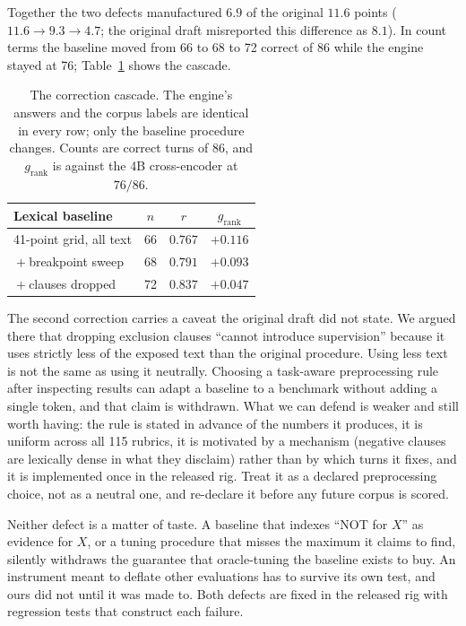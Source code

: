 \documentclass[10pt,twocolumn]{article}
\newcommand{\grank}{$g_{\mathrm{rank}}$}
\begin{document}
Together the two defects manufactured $6.9$ of the original $11.6$ points
($11.6 \rightarrow 9.3 \rightarrow 4.7$; the original draft misreported this difference as
$8.1$). In count terms the baseline moved from 66 to 68 to 72 correct of 86 while the engine
stayed at 76; Table~\ref{tab:cascade} shows the cascade.

\begin{table}[t]\centering\small
\caption{The correction cascade. The engine's answers and the corpus labels are identical in
every row; only the baseline procedure changes. Counts are correct turns of 86, and
\grank{} is against the 4B cross-encoder at $76/86$.}
\label{tab:cascade}
\begin{tabular}{lccc}
\toprule
Lexical baseline & $n$ & $r$ & \grank{} \\
\midrule
41-point grid, all text       & 66 & $0.767$ & $+0.116$ \\
${}+{}$breakpoint sweep       & 68 & $0.791$ & $+0.093$ \\
${}+{}$clauses dropped        & 72 & $0.837$ & $+0.047$ \\
\bottomrule
\end{tabular}
\end{table}

The second correction carries a caveat the original draft did not state. We argued there
that dropping exclusion clauses ``cannot introduce supervision'' because it uses strictly
less of the exposed text than the original procedure. Using less text is not the same as
using it neutrally. Choosing a task-aware preprocessing rule after inspecting results can
adapt a baseline to a benchmark without adding a single token, and that claim is withdrawn.
What we can defend is weaker and still worth having: the rule is stated in advance of the
numbers it produces, it is uniform across all 115 rubrics, it is motivated by a mechanism
(negative clauses are lexically dense in what they disclaim) rather than by which turns it
fixes, and it is implemented once in the released rig. Treat it as a declared preprocessing
choice, not as a neutral one, and re-declare it before any future corpus is scored.

Neither defect is a matter of taste. A baseline that indexes ``NOT for $X$'' as evidence for
$X$, or a tuning procedure that misses the maximum it claims to find, silently withdraws the
guarantee that oracle-tuning the baseline exists to buy. An instrument meant to deflate other
evaluations has to survive its own test, and ours did not until it was made to. Both defects
are fixed in the released rig with regression tests that construct each failure.
\end{document}
